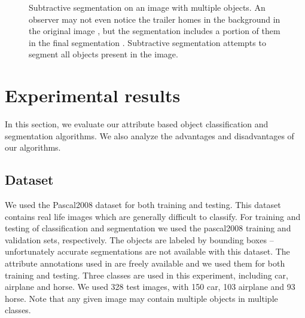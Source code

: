 \documentclass[10pt,twocolumn,letterpaper]{article}
\begin{document}
\begin{figure}
\centering
{}
 \caption{Subtractive segmentation on an image with multiple objects.
An observer may not even notice the trailer homes in the background in
the original image ,
but the segmentation includes a portion of them in the final segmentation .
Subtractive segmentation attempts to segment all objects present
in the image.}
\label{fig:sub1}
\end{figure}

\section{Experimental results}
\label{sec:results}


In this section, we evaluate our attribute based object classification
and segmentation algorithms. We also analyze the advantages and 
disadvantages of our algorithms.\\

\subsection{Dataset}
\label{ssec:dataset}

We used the Pascal2008 dataset for both training and testing. This dataset contains real life
images which are generally difficult to classify. 
For training and testing of classification and
segmentation we used the pascal2008 training and validation sets, respectively.
The objects are labeled
by bounding boxes -- unfortunately accurate segmentations are not available
with this dataset.  The attribute
annotations used in \cite{farhadi09} are freely available and we
used them for both training and testing. Three classes are used in this experiment, including car,
airplane and horse. We used 328 test images, with 150 car, 103 airplane and 93 horse. 
Note that any given image may
contain multiple objects in multiple classes.\\
\end{document}
